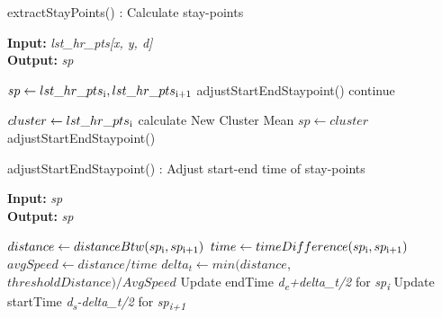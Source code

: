 \documentclass{article}
\begin{document}
\begin{algorithm}
\caption{extractStayPoints() : Calculate stay-points}
\label{pseudoPSO}
\hspace*{\algorithmicindent} \textbf{Input:}  \textit{lst\_hr\_pts[x, y, d]} \\
\hspace*{\algorithmicindent} \textbf{Output:}  \textit{sp} 
\begin{algorithmic}[1]

	\State$ sp \gets lst\_hr\_pts\textsubscript{i},  lst\_hr\_pts\textsubscript{i+1}$
	\State adjustStartEndStaypoint()
	\State continue
\EndIf

	\State $cluster \gets lst\_hr\_pts\textsubscript{i}$ 
	\State calculate New Cluster Mean
\Else
    	\State $sp \gets cluster$
    	\State adjustStartEndStaypoint()
	\EndIf
\EndIf

\EndFor
\end{algorithmic}
\end{algorithm}

\begin{algorithm}
\caption{adjustStartEndStaypoint() : Adjust start-end time of stay-points}
\label{pseudoPSO}
\hspace*{\algorithmicindent} \textbf{Input:}  \textit{sp} \\
\hspace*{\algorithmicindent} \textbf{Output:}  \textit{sp}
\begin{algorithmic}[1]
	\State $distance \gets distanceBtw(sp\textsubscript{i}, sp\textsubscript{i+1})$
	\State $time \gets timeDifference(sp\textsubscript{i}, sp\textsubscript{i+1})$
	\State $avgSpeed \gets distance/time$
	\State $delta_t \gets min(distance$, $thresholdDistance)/AvgSpeed$
	\State Update endTime \textit{d\textsubscript{e}+delta\_t/2}  for \textit{sp\textsubscript{i}}
	\State Update startTime \textit{d\textsubscript{s}-delta\_t/2} for \textit{sp\textsubscript{i+1}}
\EndFor
\end{algorithmic}
\end{algorithm}
\end{document}
